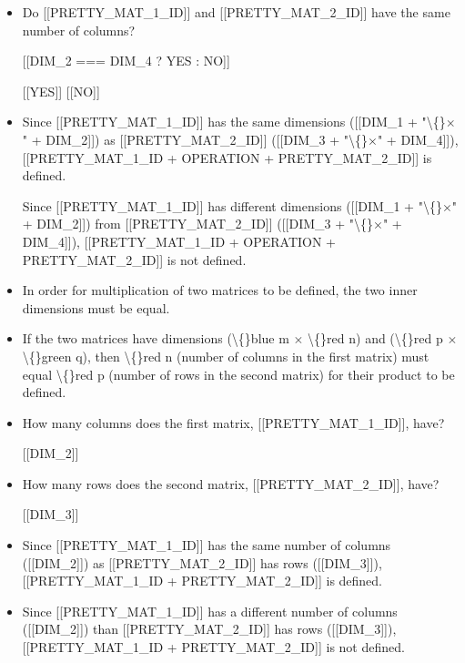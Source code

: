 \documentclass{article}
\begin{document}
\begin{itemize}
                    [[DIM\_1 === DIM\_3 ? YES : NO]]
                    
                        [[YES]]
                        [[NO]]
  \item Do [[PRETTY\_MAT\_1\_ID]] and [[PRETTY\_MAT\_2\_ID]] have the same number of columns?
                    
                    [[DIM\_2 === DIM\_4 ? YES : NO]]
                    
                        [[YES]]
                        [[NO]]
  \item Since [[PRETTY\_MAT\_1\_ID]] has
                        the same dimensions
                        ([[DIM\_1 + "\textbackslash\{\}$\times$" + DIM\_2]]) as
                        [[PRETTY\_MAT\_2\_ID]] ([[DIM\_3 + "\textbackslash\{\}$\times$" + DIM\_4]]),
                        [[PRETTY\_MAT\_1\_ID + OPERATION + PRETTY\_MAT\_2\_ID]]
                        is defined.
                    
                        Since [[PRETTY\_MAT\_1\_ID]] has
                        different dimensions
                        ([[DIM\_1 + "\textbackslash\{\}$\times$" + DIM\_2]]) from
                        [[PRETTY\_MAT\_2\_ID]] ([[DIM\_3 + "\textbackslash\{\}$\times$" + DIM\_4]]),
                        [[PRETTY\_MAT\_1\_ID + OPERATION + PRETTY\_MAT\_2\_ID]]
                        is not defined.
  \item In order for multiplication of two matrices to be defined, the two inner dimensions must be equal.
  \item If the two matrices have dimensions (\textbackslash\{\}blue m $\times$ \textbackslash\{\}red n) and (\textbackslash\{\}red p $\times$ \textbackslash\{\}green q), then \textbackslash\{\}red n (number of columns in the first matrix) must equal \textbackslash\{\}red p (number of rows in the second matrix) for their product to be defined.
  \item How many columns does the first matrix, [[PRETTY\_MAT\_1\_ID]], have?
                    
                    [[DIM\_2]]
  \item How many rows does the second matrix, [[PRETTY\_MAT\_2\_ID]], have?
                    
                    [[DIM\_3]]
  \item Since [[PRETTY\_MAT\_1\_ID]] has the same
                    number of columns ([[DIM\_2]]) as
                    [[PRETTY\_MAT\_2\_ID]] has rows
                    ([[DIM\_3]]),
                    [[PRETTY\_MAT\_1\_ID + PRETTY\_MAT\_2\_ID]]
                    is defined.
  \item Since [[PRETTY\_MAT\_1\_ID]] has a
                    different number of columns
                    ([[DIM\_2]]) than
                    [[PRETTY\_MAT\_2\_ID]] has rows
                    ([[DIM\_3]]),
                    [[PRETTY\_MAT\_1\_ID + PRETTY\_MAT\_2\_ID]]
                    is not defined.
\end{itemize}
\end{document}
